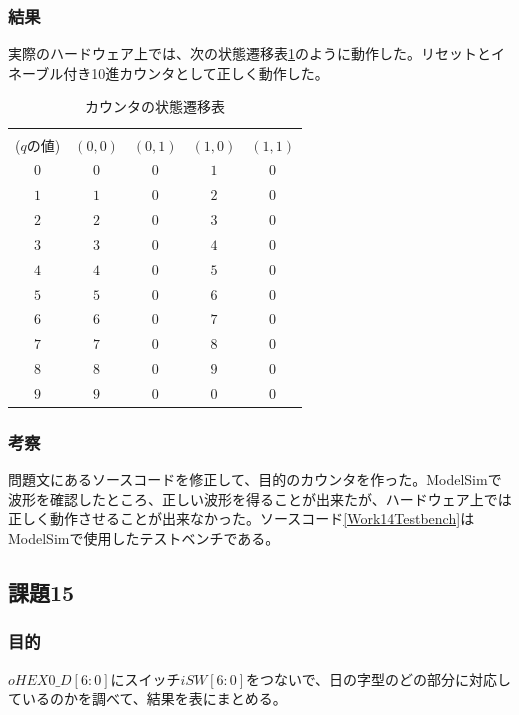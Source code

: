 \documentclass[a4paper]{jarticle}
\begin{document}
\subsubsection{結果}
実際のハードウェア上では、次の状態遷移表\ref{Work14StateTransitionTable}のように動作した。リセットとイネーブル付き10進カウンタとして正しく動作した。
\begin{table}[!h]
	\begin{center}
		\caption{カウンタの状態遷移表}
		\label{Work14StateTransitionTable}
		\begin{tabular}{|c||c|c|c|c|}
			\hline
			\backslashbox{現状態\\($q$の値)}{$\left(en,clr\right)$}	&$\left(0,0\right)$	&$\left(0,1\right)$	&$\left(1,0\right)$	&$\left(1,1\right)$\\	\hline
			$0$							&$0$			&$0$			&$1$			&$0$\\			\hline
			$1$							&$1$			&$0$			&$2$			&$0$\\			\hline
			$2$							&$2$			&$0$			&$3$			&$0$\\			\hline
			$3$							&$3$			&$0$			&$4$			&$0$\\			\hline
			$4$							&$4$			&$0$			&$5$			&$0$\\			\hline
			$5$							&$5$			&$0$			&$6$			&$0$\\			\hline
			$6$							&$6$			&$0$			&$7$			&$0$\\			\hline
			$7$							&$7$			&$0$			&$8$			&$0$\\			\hline
			$8$							&$8$			&$0$			&$9$			&$0$\\			\hline
			$9$							&$9$			&$0$			&$0$			&$0$\\			\hline
		\end{tabular}
	\end{center}
\end{table}
\subsubsection{考察}
問題文にあるソースコードを修正して、目的のカウンタを作った。ModelSimで波形を確認したところ、正しい波形を得ることが出来たが、ハードウェア上では正しく動作させることが出来なかった。ソースコード\ref{Work14Testbench}はModelSimで使用したテストベンチである。

\subsection{課題15}
\subsubsection{目的}
$oHEX0\_D[6:0]$にスイッチ$iSW[6:0]$をつないで、日の字型のどの部分に対応しているのかを調べて、結果を表にまとめる。
\end{document}
